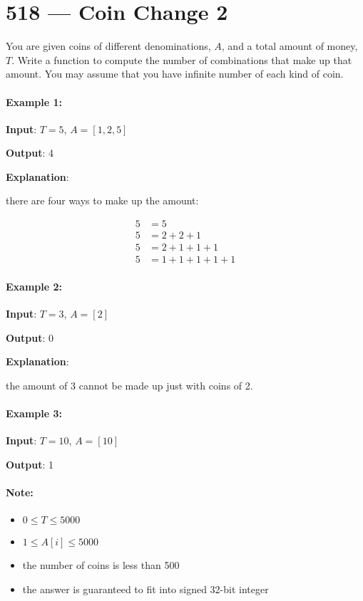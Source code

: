 \section{518 --- Coin Change 2}

You are given coins of different denominations, $A$, and a total amount of money, $T$. Write a function to compute the number of combinations that make up that amount. You may assume that you have infinite number of each kind of coin.

\paragraph{Example 1:}

\begin{flushleft}
\textbf{Input}: $T = 5$, $A = [1, 2, 5]$

\textbf{Output}: 4

\textbf{Explanation}: 

there are four ways to make up the amount:

\begin{align*}
5 &= 5\\
5&=2+2+1\\
5&=2+1+1+1\\
5&=1+1+1+1+1
\end{align*}

\end{flushleft}

\paragraph{Example 2:}

\begin{flushleft}
\textbf{Input}: $T = 3$, $A = [2]$

\textbf{Output}: 0

\textbf{Explanation}: 

the amount of 3 cannot be made up just with coins of 2.

\end{flushleft}


\paragraph{Example 3:}

\begin{flushleft}
\textbf{Input}: $T = 10$, $A = [10]$

\textbf{Output}: 1

\end{flushleft}
 

\paragraph{Note:}

\begin{itemize}
\item $0 \leq T \leq 5000$
\item $1 \leq A[i] \leq 5000$
\item the number of coins is less than 500
\item the answer is guaranteed to fit into signed 32-bit integer
\end{itemize}

